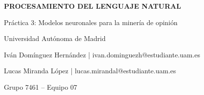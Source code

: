 \documentclass[10pt,a4paper]{article}
\renewcommand{\_}{\guionbajo\allowbreak}
\begin{document}
\sloppy

\begin{titlepage}
    \centering
    \vfill
    {\huge \textbf{PROCESAMIENTO DEL LENGUAJE NATURAL} \par}
    \vspace{2cm}
    {\Large Práctica 3: Modelos neuronales para la minería de opinión \par}
    \vspace{1cm}
    {\Large Universidad Autónoma de Madrid \par}
    \vspace{1cm}
    {\large Iván Domínguez Hernández |  ivan.dominguezh@estudiante.uam.es \par}
    \vspace{.5cm}
    {\large Lucas Miranda López | lucas.mirandal@estudiante.uam.es \par}
    \vspace{1cm}
    {\large Grupo 7461 -- Equipo 07 \par}
    \vspace{1cm}
\end{titlepage}

\tableofcontents

\newpage
\end{document}
